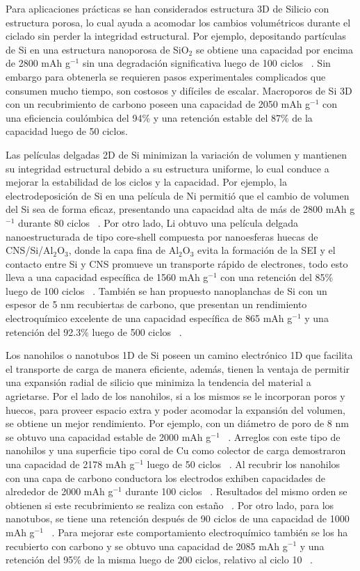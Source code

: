 Para aplicaciones prácticas se han considerados estructura 3D de Silicio con 
estructura porosa, lo cual ayuda a acomodar los cambios volumétricos durante el 
ciclado sin perder la integridad estructural. Por ejemplo, depositando partículas
de Si en una estructura nanoporosa de SiO$_2$ se obtiene una capacidad por encima
de 2800 mAh g$^{-1}$ sin una degradación significativa luego de 100 ciclos 
~\cite{cho2010}. Sin embargo para obtenerla se requieren pasos experimentales 
complicados que consumen mucho tiempo, son costosos y difíciles de escalar.
Macroporos de Si 3D con un recubrimiento de carbono poseen una capacidad de 
2050 mAh g$^{-1}$ con una eficiencia coulómbica del 94\% y una retención estable
del 87\% de la capacidad luego de 50 ciclos.

Las películas delgadas 2D de Si minimizan la variación de volumen y mantienen su 
integridad estructural debido a su estructura uniforme, lo cual conduce a 
mejorar la estabilidad de los ciclos y la capacidad. Por ejemplo, la 
electrodeposición de Si en una película de Ni permitió que el cambio de volumen 
del Si sea de forma eficaz, presentando una capacidad alta de más de 2800 mAh 
g$^{-1}$ durante 80 ciclos ~\cite{zhao2012}. Por otro lado, Li obtuvo una 
película delgada nanoestructurada de tipo core-shell compuesta por nanoesferas 
huecas de CNS/Si/Al$_2$O$_3$, donde la capa fina de Al$_2$O$_3$ evita la 
formación de la SEI y el contacto entre Si y CNS promueve un transporte rápido 
de electrones, todo esto lleva a una capacidad específica de 1560 mAh g$^{-1}$ 
con una retención del 85\% luego de 100 ciclos ~\cite{li2015}. También se han 
propuesto nanoplanchas de Si con un espesor de 5 nm recubiertas de carbono, que 
presentan un rendimiento electroquímico excelente de una capacidad específica de 
865 mAh g$^{-1}$ y una retención del 92.3\% luego de 500 ciclos ~\cite{ryu2016}.

Los nanohilos o nanotubos 1D de Si poseen un camino electrónico 1D que facilita 
el transporte de carga de manera eficiente, además, tienen la ventaja de permitir
una expansión radial de silicio que minimiza la tendencia del material a 
agrietarse. Por el lado de los nanohilos, si a los mismos se le incorporan poros 
y huecos, para proveer espacio extra y poder acomodar la expansión del volumen, 
se obtiene un mejor rendimiento. Por ejemplo, con un diámetro de poro de 8 nm se 
obtuvo una capacidad estable de 2000 mAh g$^{-1}$ ~\cite{ge2012}. Arreglos con 
este tipo de nanohilos y una superficie tipo coral de Cu como colector de carga 
demostraron una capacidad de 2178 mAh g$^{-1}$ luego de 50 ciclos 
~\cite{jing2014}. Al recubrir los nanohilos con una capa de carbono conductora 
los electrodos exhiben capacidades de alrededor de 2000 mAh g$^{-1}$ durante 100 
ciclos ~\cite{bogart2014}. Resultados del mismo orden se obtienen si este 
recubrimiento se realiza con estaño ~\cite{kohandehghan2014}. Por otro lado, 
para los nanotubos, se tiene una retención después de 90 ciclos de una capacidad 
de 1000 mAh g$^{-1}$ ~\cite{wen2013nt}. Para mejorar este comportamiento 
electroquímico también se los ha recubierto con carbono y se obtuvo una 
capacidad de 2085 mAh g$^{-1}$ y una retención del 95\% de la misma luego de 200
ciclos, relativo al ciclo 10 ~\cite{lu2014}.

